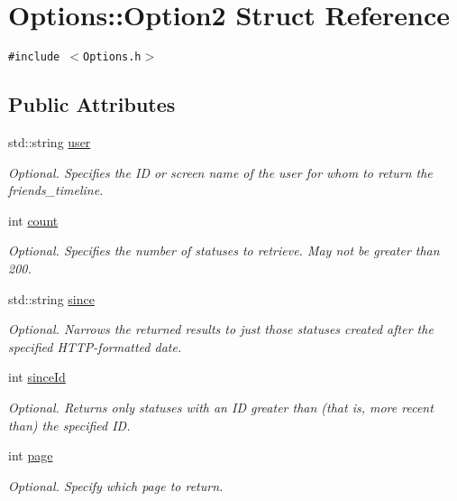 \hypertarget{structOptions_1_1Option2}{
\section{Options::Option2 Struct Reference}
\label{structOptions_1_1Option2}
}
{\tt \#include $<$Options.h$>$}

\subsection*{Public Attributes}
\begin{CompactItemize}
\item 
std::string \hyperlink{structOptions_1_1Option2_4b4acb0acc11bd5f5a9c6a4e8e083b61}{user}
\begin{CompactList}\small\item\em Optional. Specifies the ID or screen name of the user for whom to return the friends\_\-timeline. \item\end{CompactList}\item 
int \hyperlink{structOptions_1_1Option2_6c4dbe83e6027381adbbb5dd39989448}{count}
\begin{CompactList}\small\item\em Optional. Specifies the number of statuses to retrieve. May not be greater than 200. \item\end{CompactList}\item 
std::string \hyperlink{structOptions_1_1Option2_c03c10675d4f7ee92dd836f56d794076}{since}
\begin{CompactList}\small\item\em Optional. Narrows the returned results to just those statuses created after the specified HTTP-formatted date. \item\end{CompactList}\item 
int \hyperlink{structOptions_1_1Option2_85cbc83ca0aba0dad6aa4c302e0e09a4}{sinceId}
\begin{CompactList}\small\item\em Optional. Returns only statuses with an ID greater than (that is, more recent than) the specified ID. \item\end{CompactList}\item 
int \hyperlink{structOptions_1_1Option2_a88bf925f3448deab05709b0c9d6779d}{page}
\begin{CompactList}\small\item\em Optional. Specify which page to return. \item\end{CompactList}\end{CompactItemize}



